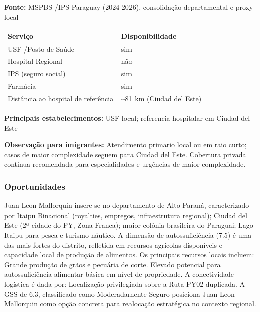 \textbf{Fonte:} MSPBS /\allowbreak  IPS Paraguay (2024-2026), consolidação
departamental e proxy local

{\def\LTcaptype{none} %
\begin{longtable}{@{}>{\raggedright\arraybackslash}p{0.45\linewidth} >{\raggedright\arraybackslash}p{0.45\linewidth}@{}}
\toprule\noalign{}
Serviço & Disponibilidade \\
\midrule\noalign{}
\endhead
\bottomrule\noalign{}
\endlastfoot
USF /\allowbreak  Posto de Saúde & sim \\
Hospital Regional & não \\
IPS (seguro social) & sim \\
Farmácia & sim \\
Distância ao hospital de referência & \textasciitilde81 km (Ciudad del
Este) \\
\end{longtable}
}

\textbf{Principais estabelecimentos:} USF local; referencia hospitalar
em Ciudad del Este

\textbf{Observação para imigrantes:} Atendimento primario local ou em
raio curto; casos de maior complexidade seguem para Ciudad del Este.
Cobertura privada continua recomendada para especialidades e urgências
de maior complexidade.
\newpage

\subsubsection*{Oportunidades}\label{oport-juan-leon-mallorquin-1011}
Juan Leon Mallorquin insere-se no departamento de Alto Paraná, caracterizado por Itaipu Binacional (royalties, empregos, infraestrutura regional); Ciudad del Este (2ª cidade do PY, Zona Franca); maior colônia brasileira do Paraguai; Lago Itaipu para pesca e turismo náutico. A dimensão de autossuficiência (7.5) é uma das mais fortes do distrito, refletida em recursos agrícolas disponíveis e capacidade local de produção de alimentos. Os principais recursos locais incluem: Grande produção de grãos e pecuária de corte. Elevado potencial para autossuficiência alimentar básica em nível de propriedade. A conectividade logística é dada por: Localização privilegiada sobre a Ruta PY02 duplicada. A GSS de 6.3, classificado como Moderadamente Seguro posiciona Juan Leon Mallorquin como opção concreta para realocação estratégica no contexto regional.

